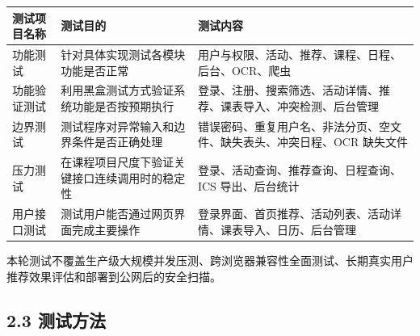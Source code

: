 {\def\LTcaptype{none} %
\begin{longtable}[]{@{}|
  >{\raggedright\arraybackslash}p{}|
  >{\raggedright\arraybackslash}p{}|
  >{\raggedright\arraybackslash}p{}|@{}}
\hline
\rowcolor{gray!12}
\begin{minipage}[b]{\linewidth}\raggedright
\bfseries 测试项目名称
\end{minipage} & \begin{minipage}[b]{\linewidth}\raggedright
\bfseries 测试目的
\end{minipage} & \begin{minipage}[b]{\linewidth}\raggedright
\bfseries 测试内容
\end{minipage} \\
\hline
\endhead
\hline
\endlastfoot
功能测试 & 针对具体实现测试各模块功能是否正常 &
用户与权限、活动、推荐、课程、日程、后台、OCR、爬虫 \\
\hline
功能验证测试 & 利用黑盒测试方式验证系统功能是否按预期执行 &
登录、注册、搜索筛选、活动详情、推荐、课表导入、冲突检测、后台管理 \\
\hline
边界测试 & 测试程序对异常输入和边界条件是否正确处理 &
错误密码、重复用户名、非法分页、空文件、缺失表头、冲突日程、OCR
缺失文件 \\
\hline
压力测试 & 在课程项目尺度下验证关键接口连续调用时的稳定性 &
登录、活动查询、推荐查询、日程查询、ICS 导出、后台统计 \\
\hline
用户接口测试 & 测试用户能否通过网页界面完成主要操作 &
登录界面、首页推荐、活动列表、活动详情、课表导入、日历、后台管理 \\
\hline
\end{longtable}
}

本轮测试不覆盖生产级大规模并发压测、跨浏览器兼容性全面测试、长期真实用户推荐效果评估和部署到公网后的安全扫描。

\subsection{2.3 测试方法}\label{ux6d4bux8bd5ux65b9ux6cd5}

